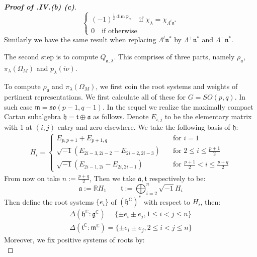 \documentclass[11pt]{report}
\theoremstyle{definition}
\theoremstyle{plain}
\newcommand{\real}{\mathbb{R}}
\newcommand{\complex}{\mathbb{C}}
\newcommand{\Lie}[1]{\mathfrak{#1}}
\begin{document}
\begin{proof}[\textbf{Proof of .IV.(b) (c)}]
\begin{equation}
\begin{cases}
	(-1)^{\frac{1}{2}\dim \Lie{p}_\Lie{m}} \quad \text{if $\chi_{\lambda}=\chi_{\Lambda^l\Lie{n}^*}$}\\
	0 \quad \text{if otherwise}
	\end{cases}
	\end{equation}
	Similarly we have the same result when replacing $\Lambda^l\Lie{n}^*$ by $\Lambda^+\Lie{n}^*$ and $\Lambda^-\Lie{n}^*$.
\par The second step is to compute $Q_{\Lie{a}, \lambda}$. This comprises of three parts, namely $\rho_{\Lie{a}}$, $\pi_{\lambda}(\Omega_M)$ and $p_\lambda(i\nu)$. 
\par To compute $\rho_{\Lie{a}}$ and $\pi_{\lambda}(\Omega_M)$, we first coin the root systems and weights of pertinent representations. We first calculate all of these for $G=SO(p,q)$. In such case $\Lie{m}=\Lie{so}(p-1,q-1)$. In the sequel we realize the maximally compact Cartan subalgebra $\Lie{h}=\Lie{t}\oplus \Lie{a}$ as follows. Denote $E_{i,j}$ to be the elementary matrix with 1 at $(i,j)$-entry and zero elsewhere. We take the following basis of $\Lie{h}$:
\begin{equation}
\begin{split}
H_i=\begin{cases}
E_{p,p+1}+E_{p+1,q} \quad &\text{for }i=1\\
\sqrt{-1}(E_{2i-3,2i-2}-E_{2i-2,2i-3})\quad &\text{for }2\leq i\leq \frac{p+1}{2}\\
\sqrt{-1}(E_{2i-1, 2i}-E_{2i,2i-1})\quad &\text{for }\frac{p+1}{2}<i\leq \frac{p+q}{2}
\end{cases}
\end{split}
\end{equation}
From now on take $n:=\frac{p+q}{2}$, Then we take $\Lie{a}, \Lie{t}$ respectively to be:
\begin{equation*}
\Lie{a}:=\real H_1 \qquad \Lie{t}:=\bigoplus_{i=2}^{n}\sqrt{-1}H_i
\end{equation*}
Then define the root systems $\{e_i\}$ of $(\Lie{h}^\complex)^*$ with respect to $H_i$, then:
\begin{equation*}
\begin{split}
\Delta(\Lie{h}^\complex:\Lie{g}^\complex)=\{\pm e_i\pm e_j, 1\leq i<j\leq n\}\\
\Delta(\Lie{t}^\complex:\Lie{m}^\complex)=\{\pm e_i\pm e_j, 2\leq i<j\leq n\}
\end{split}
\end{equation*}
Moreover, we fix positive systems of roots by:
\begin{equation*}

\end{equation*}
\end{proof}
\end{document}
